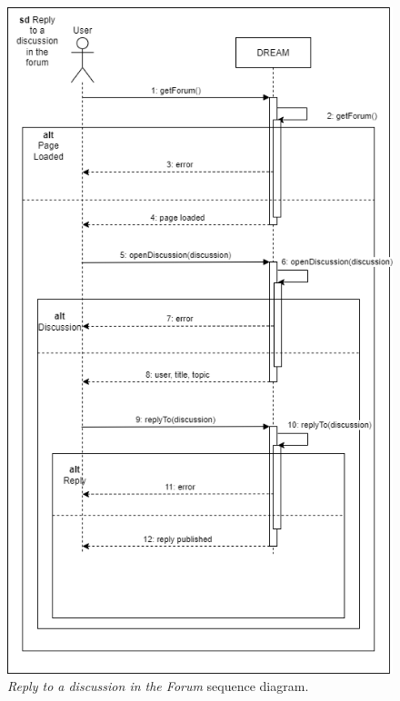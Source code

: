 \begin{figure}[H]
    \centering
    \includegraphics[height=1.5\linewidth]{Images/Use Case/UC9.png}
    \caption{\textit{Reply to a discussion in the Forum} sequence diagram.}
\end{figure}
\newpage

